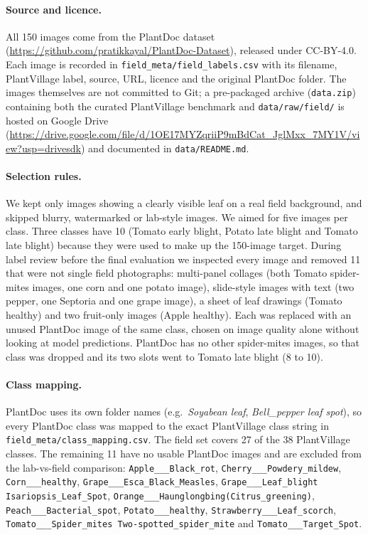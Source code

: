 \paragraph{Source and licence.}
All 150 images come from the PlantDoc dataset~\cite{plantdoc} (\url{https://github.com/pratikkayal/PlantDoc-Dataset}), released under CC-BY-4.0. Each image is recorded in \texttt{field\_meta/field\_labels.csv} with its filename, PlantVillage label, source, URL, licence and the original PlantDoc folder. The images themselves are not committed to Git; a pre-packaged archive (\texttt{data.zip}) containing both the curated PlantVillage benchmark and \texttt{data/raw/field/} is hosted on Google Drive (\url{https://drive.google.com/file/d/1OE17MYZqriiP9mBdCat_JglMxx_7MY1V/view?usp=drivesdk}) and documented in \texttt{data/README.md}.

\paragraph{Selection rules.}
We kept only images showing a clearly visible leaf on a real field background, and skipped blurry, watermarked or lab-style images. We aimed for five images per class. Three classes have 10 (Tomato early blight, Potato late blight and Tomato late blight) because they were used to make up the 150-image target. During label review before the final evaluation we inspected every image and removed 11 that were not single field photographs: multi-panel collages (both Tomato spider-mites images, one corn and one potato image), slide-style images with text (two pepper, one Septoria and one grape image), a sheet of leaf drawings (Tomato healthy) and two fruit-only images (Apple healthy). Each was replaced with an unused PlantDoc image of the same class, chosen on image quality alone without looking at model predictions. PlantDoc has no other spider-mites images, so that class was dropped and its two slots went to Tomato late blight (8 to 10).

\paragraph{Class mapping.}
PlantDoc uses its own folder names (e.g.\ \textit{Soyabean leaf}, \textit{Bell\_pepper leaf spot}), so every PlantDoc class was mapped to the exact PlantVillage class string in \texttt{field\_meta/class\_mapping.csv}. The field set covers 27 of the 38 PlantVillage classes. The remaining 11 have no usable PlantDoc images and are excluded from the lab-vs-field comparison: \texttt{Apple\_\_\_Black\_rot}, \texttt{Cherry\_\_\_Powdery\_mildew}, \texttt{Corn\_\_\_healthy}, \texttt{Grape\_\_\_Esca\_Black\_Measles}, \texttt{Grape\_\_\_Leaf\_blight Isariopsis\_Leaf\_Spot}, \texttt{Orange\_\_\_Haunglongbing(Citrus\_greening)}, \texttt{Peach\_\_\_Bacterial\_spot}, \texttt{Potato\_\_\_healthy}, \texttt{Strawberry\_\_\_Leaf\_scorch}, \texttt{Tomato\_\_\_Spider\_mites Two-spotted\_spider\_mite} and \texttt{Tomato\_\_\_Target\_Spot}.

